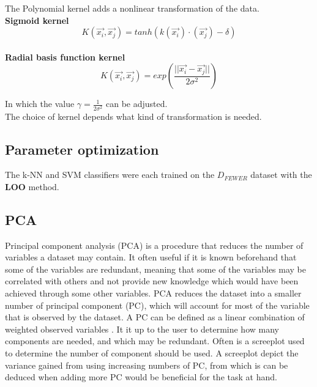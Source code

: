 The Polynomial kernel adds a nonlinear transformation of the data.
\\

\textbf{Sigmoid kernel}
\begin{equation}
K(\overrightarrow{x_i},\overrightarrow{x_j}) = tanh( k(\overrightarrow{x_i}) 
\cdot (\overrightarrow{x_j}) - \delta)
\end{equation}
\\

\textbf{Radial basis function kernel}
\begin{equation}
K(\overrightarrow{x_i},\overrightarrow{x_j}) =  
exp\left(\frac{||\overrightarrow{x_i} - 
\overrightarrow{x_j}||}{2\sigma^2}\right)
\end{equation}

In which the value $\gamma = \frac{1}{2\sigma^2}$ can be adjusted.\\


The choice of kernel depends what kind of transformation is needed. 

\subsection{Parameter optimization}
The k-NN and SVM classifiers were each trained on the \(D_{FEWER}\) dataset with the \textbf{LOO} method.

\subsection{PCA}
Principal component analysis (PCA) is a procedure that reduces the number of 
variables a dataset may contain.  It often useful if it is known beforehand that 
some of the variables are redundant, meaning that some of the variables may be 
correlated with others and not provide new knowledge which would have been 
achieved through some other variables.  PCA reduces the dataset into a smaller 
number of principal component (PC), which will account for most of the variable 
that is observed by the dataset. A PC can be defined as a linear combination of 
weighted observed variables . It it up to the user to determine how many 
components are needed, and which may be redundant. Often is a screeplot used to 
determine the number of component should be used. A screeplot depict the 
variance gained from using increasing numbers of PC, from which is can be 
deduced when adding more PC would be beneficial for the task at hand. \\


